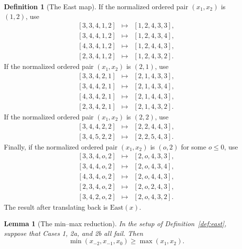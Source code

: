 \documentclass[11pt]{article}
\theoremstyle{plain}
\newtheorem{lemma}[theorem]{Lemma}
\theoremstyle{definition}
\newtheorem{definition}[theorem]{Definition}
\theoremstyle{remark}
\begin{document}
\begin{definition}[The East map]
If the normalized ordered pair \((x_1,x_2)\) is \((1,2)\), use
\[
\begin{array}{rcl}
{[3,3,4,1,2]} &\mapsto& {[1,2,4,3,3]},\\[2pt]
{[3,4,4,1,2]} &\mapsto& {[1,2,4,3,4]},\\[2pt]
{[4,3,4,1,2]} &\mapsto& {[1,2,4,4,3]},\\[2pt]
{[2,3,4,1,2]} &\mapsto& {[1,2,4,3,2]}.
\end{array}
\]
If the normalized ordered pair \((x_1,x_2)\) is \((2,1)\), use
\[
\begin{array}{rcl}
{[3,3,4,2,1]} &\mapsto& {[2,1,4,3,3]},\\[2pt]
{[3,4,4,2,1]} &\mapsto& {[2,1,4,3,4]},\\[2pt]
{[4,3,4,2,1]} &\mapsto& {[2,1,4,4,3]},\\[2pt]
{[2,3,4,2,1]} &\mapsto& {[2,1,4,3,2]}.
\end{array}
\]
If the normalized ordered pair \((x_1,x_2)\) is \((2,2)\), use
\[
\begin{array}{rcl}
{[3,4,4,2,2]} &\mapsto& {[2,2,4,4,3]},\\[2pt]
{[3,4,5,2,2]} &\mapsto& {[2,2,5,4,3]}.
\end{array}
\]
Finally, if the normalized ordered pair \((x_1,x_2)\) is \((o,2)\) for some
\(o\le 0\), use
\[
\begin{array}{rcl}
{[3,3,4,o,2]} &\mapsto& {[2,o,4,3,3]},\\[2pt]
{[3,4,4,o,2]} &\mapsto& {[2,o,4,3,4]},\\[2pt]
{[4,3,4,o,2]} &\mapsto& {[2,o,4,4,3]},\\[2pt]
{[2,3,4,o,2]} &\mapsto& {[2,o,2,4,3]},\\[2pt]
{[3,4,2,o,2]} &\mapsto& {[2,o,4,3,2]}.
\end{array}
\]
The result after translating back is \(\mathrm{East}(x)\).
\end{definition}

\begin{lemma}[The min--max reduction]
\label{lem:minmax}
In the setup of Definition~\ref{def:east}, suppose that Cases 1, 2a, and 2b
all fail.  Then
\[
  \min(x_{-2},x_{-1},x_0)\ge \max(x_1,x_2).
\]
\end{lemma}
\end{document}
